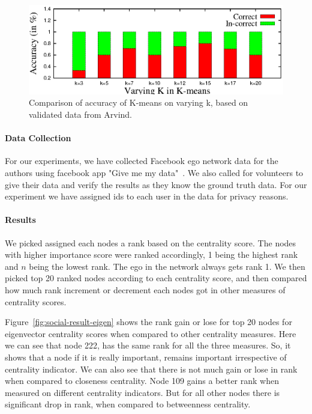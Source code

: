 \begin{figure}[!ht]
    \centering
    \includegraphics[width=1\textwidth]{figures/social-result_arvind_kmeans.eps}
    \caption{Comparison of accuracy of K-means on varying k, based on validated data from Arvind.}
    \label{fig:social-result-arvind-kmeans}
\end{figure}

\paragraph{Data Collection}
For our experiments, we have collected Facebook ego network data for
the authors using facebook app "Give me my data"~\cite{givememydata}.
We also called for volunteers to give their data and verify the
results as they know the ground truth data.  For our experiment we
have assigned ids to each user in the data for privacy reasons. 

\paragraph{Results}
We picked assigned each nodes a rank based on the centrality score.
The nodes with higher importance score were ranked accordingly, 1
being the highest rank and $n$ being the lowest rank.  The ego in the
network always gets rank 1.  We then picked top 20 ranked nodes
according to each centrality score, and then compared how much rank
increment or decrement each nodes got in other measures of centrality
scores.

Figure~\ref{fig:social-result-eigen} shows the rank gain or lose for
top 20 nodes for eigenvector centrality scores when compared to other
centrality measures.  Here we can see that node 222, has the same rank
for all the three measures.  So, it shows that a node if it is really
important, remains important irrespective of centrality indicator.  We
can also see that there is not much gain or lose in rank when compared
to closeness centrality.  Node 109 gains a better rank when measured
on different centrality indicators.  But for all other nodes there is
significant drop in rank, when compared to betweenness centrality.

